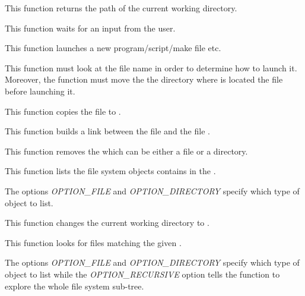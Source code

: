          {
	   This function returns the path of the current working directory.
	 }

         {
	   This function waits for an input from the user.
	 }

         {
	   This function launches a new program/script/make file etc.

	   \-

	   This function must look at the file name in order to determine
	   how to launch it. Moreover, the function must move the the
	   directory where is located the file before launching it.
	 }

         {
	   This function copies the file  to
	   .
	 }

         {
	   This function builds a link between the file 
	   and the file .
	 }

         {
	   This function removes the  which can be either
	   a file or a directory.
	 }

         {
	   This function lists the file system objects contains in the
	   .

	   \-

	   The options \textit{OPTION\_FILE} and \textit{OPTION\_DIRECTORY}
	   specify which type of object to list.
	 }

         {
	   This function changes the current working directory to
	   .
	 }

         {
	   This function looks for files matching the given .

	   \-

	   The options \textit{OPTION\_FILE} and \textit{OPTION\_DIRECTORY}
	   specify which type of object to list while the
	   \textit{OPTION\_RECURSIVE} option tells the function to explore
	   the whole file system sub-tree.
	 }

